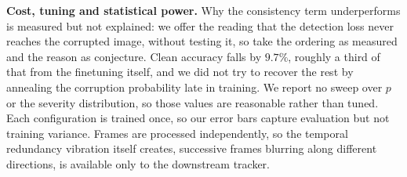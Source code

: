 \medskip\noindent\textbf{Cost, tuning and statistical power.}
Why the consistency term underperforms is measured but not explained: we offer the
reading that the detection loss never reaches the corrupted image, without testing
it, so take the ordering as measured and the reason as conjecture. Clean accuracy
falls by $9.7\%$, roughly a third of that from the finetuning itself, and we did not
try to recover the rest by annealing the corruption probability late in training.
We report no sweep over $p$ or the severity distribution, so those values are
reasonable rather than tuned. Each configuration is trained once, so our error bars
capture evaluation but not training variance. Frames are processed independently,
so the temporal redundancy vibration itself creates, successive frames blurring
along different directions, is available only to the downstream tracker.
